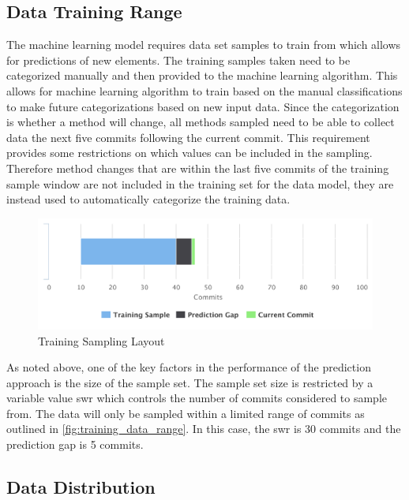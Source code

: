 \subsection{Data Training Range}

The machine learning model requires data set samples to train from which allows for predictions of new elements. The training samples taken need to be categorized manually and then provided to the machine learning algorithm. This allows for machine learning algorithm to train based on the manual classifications to make future categorizations based on new input data. Since the categorization is whether a method will change, all methods sampled need to be able to collect data the next five commits following the current commit. This requirement provides some restrictions on which values can be included in the sampling. Therefore method changes that are within the last five commits of the training sample window are not included in the training set for the data model, they are instead used to automatically categorize the training data.

\begin{figure}[!ht]
    \centering
        \includegraphics[width=1.0\textwidth]{images/training_sampling}
    \caption{Training Sampling Layout}
    \label{fig:training_data_range}
\end{figure}

As noted above, one of the key factors in the performance of the prediction approach is the size of the sample set. The sample set size is restricted by a variable value \gls{swr} which controls the number of commits considered to sample from. The data will only be sampled within a limited range of commits as outlined in \autoref{fig:training_data_range}. In this case, the \gls{swr} is 30 commits and the prediction gap is 5 commits.

\subsection{Data Distribution}

